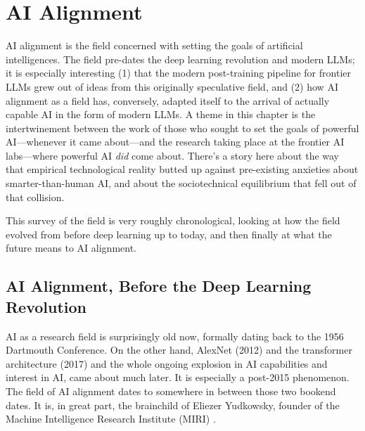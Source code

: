 \chapter{AI Alignment}\label{ch_ai_alignment}

AI alignment is the field concerned with setting the goals of artificial
intelligences. The field pre-dates the deep learning revolution and modern
LLMs; it is especially interesting (1) that the modern post-training pipeline
for frontier LLMs grew out of ideas from this originally speculative field, and
(2) how AI alignment as a field has, conversely, adapted itself to the arrival
of actually capable AI in the form of modern LLMs. A theme in this chapter is
the intertwinement between the work of those who sought to set the goals of
powerful AI---whenever it came about---and the research taking place at the
frontier AI labs---where powerful AI \emph{did} come about. There's a story
here about the way that empirical technological reality butted up against
pre-existing anxieties about smarter-than-human AI, and about the
sociotechnical equilibrium that fell out of that collision.

This survey of the field is very roughly chronological, looking at how the
field evolved from before deep learning up to today, and then finally at what
the future means to AI alignment.

\section{AI Alignment, Before the Deep Learning Revolution}
AI as a research field is surprisingly old now, formally dating back to the
1956 Dartmouth Conference. On the other hand, AlexNet (2012)
\cite{krizhevsky2012imagenet} and the transformer architecture (2017)
\cite{vaswani2017attention} and the whole ongoing explosion in AI capabilities
and interest in AI, came about much later. It is especially a post-2015
phenomenon. The field of AI alignment dates to somewhere in between those two
bookend dates. It is, in great part, the brainchild of Eliezer Yudkowsky,
founder of the Machine Intelligence Research Institute (MIRI)
\cite{yudkowsky2008factor}.

